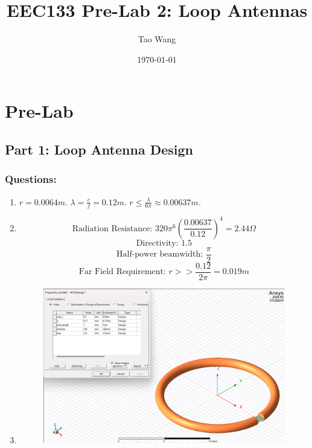 \documentclass{article} %
\begin{document}
\title{EEC133 Pre-Lab 2: Loop Antennas}
\author{Tao Wang}
\date{\today}

\maketitle
\tableofcontents

\section*{Pre-Lab}

\subsection*{Part 1: Loop Antenna Design}

\subsubsection*{Questions:}
\begin{enumerate}
    \item $r = 0.0064 \si{m}$. $\lambda = \frac{c}{f} = 0.12 \si{m}$. $r \leq \frac{\lambda}{6 \pi} \approx 0.00637 \si{m}$.
    \item
          \[\text{Radiation Resistance: }320 \pi^6 \left(\frac{0.00637}{0.12}\right)^4 = 2.44 \Omega \]
          \[\text{Directivity: } 1.5\]
          \[\text{Half-power beamwidth: } \frac{\pi}{2}\]
          \[\text{Far Field Requirement: } r >> \frac{0.12}{2\pi} = 0.019 \si{m}\]
    \item
          \begin{figure}[H]
              \centering
              \includegraphics[width=1\textwidth]{./image/figure1.png}
              \caption{}
          \end{figure}
\end{enumerate}
\end{document}
